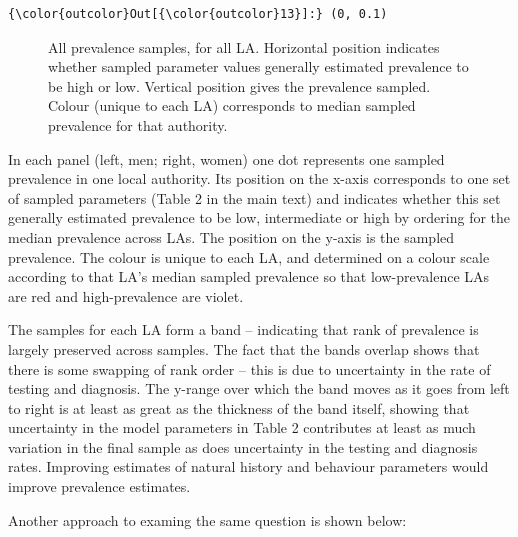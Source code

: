 \documentclass{article}
\begin{document}
    \begin{footnotesize}
            \begin{Verbatim}[commandchars=\\\{\}]
{\color{outcolor}Out[{\color{outcolor}13}]:} (0, 0.1)
\end{Verbatim}
    \end{footnotesize}
        
    \begin{figure}
        \begin{center}\end{center}
        \caption{All prevalence samples, for all LA. Horizontal position indicates whether sampled parameter values generally estimated prevalence to be high or low. Vertical position gives the prevalence sampled. Colour (unique to each LA) corresponds to median sampled prevalence for that authority.}
        \label{}
    \end{figure}
    
    In each panel (left, men; right, women) one dot represents one sampled
prevalence in one local authority. Its position on the x-axis
corresponds to one set of sampled parameters (Table 2 in the main text)
and indicates whether this set generally estimated prevalence to be low,
intermediate or high by ordering for the median prevalence across LAs.
The position on the y-axis is the sampled prevalence. The colour is
unique to each LA, and determined on a colour scale according to that
LA's median sampled prevalence so that low-prevalence LAs are red and
high-prevalence are violet.

The samples for each LA form a band -- indicating that rank of
prevalence is largely preserved across samples. The fact that the bands
overlap shows that there is some swapping of rank order -- this is due
to uncertainty in the rate of testing and diagnosis. The y-range over
which the band moves as it goes from left to right is at least as great
as the thickness of the band itself, showing that uncertainty in the
model parameters in Table 2 contributes at least as much variation in
the final sample as does uncertainty in the testing and diagnosis rates.
Improving estimates of natural history and behaviour parameters would
improve prevalence estimates.

Another approach to examing the same question is shown below:
\end{document}
